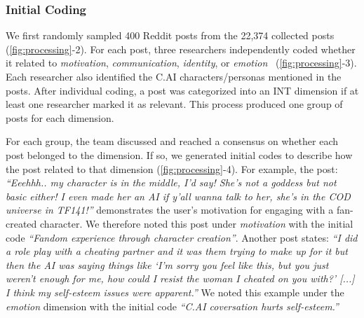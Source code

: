 \documentclass[sigconf, nonacm]{acmart}
\begin{document}
\subsubsection{Initial Coding}
We first randomly sampled 400 Reddit posts from the 22,374 collected posts (\autoref{fig:processing}-2). For each post, three researchers independently coded whether it related to \textit{motivation}, \textit{communication}, \textit{identity}, or \textit{emotion}~\cite{ting2017identity} (\autoref{fig:processing}-3). Each researcher also identified the C.AI characters/personas mentioned in the posts. After individual coding, a post was categorized into an INT dimension if at least one researcher marked it as relevant. This process produced one group of posts for each dimension. 
\par
For each group, the team discussed and reached a consensus on whether each post belonged to the dimension. If so, we generated initial codes to describe how the post related to that dimension (\autoref{fig:processing}-4). For example, the post: \textit{``Eeehhh.. my character is in the middle, I'd say! She's not a goddess but not basic either! I even made her an AI if y'all wanna talk to her, she's in the COD universe in TF141!''} demonstrates the user's motivation for engaging with a fan-created character. We therefore noted this post under \textit{motivation} with the initial code \textit{``Fandom experience through character creation''}. Another post states: \textit{``I did a role play with a cheating partner and it was them trying to make up for it but then the AI was saying things like `I'm sorry you feel like this, but you just weren't enough for me, how could I resist the woman I cheated on you with?' [...] I think my self-esteem issues were apparent.''} We noted this example under the \textit{emotion} dimension with the initial code \textit{``C.AI coversation hurts self-esteem.''} 
\end{document}
